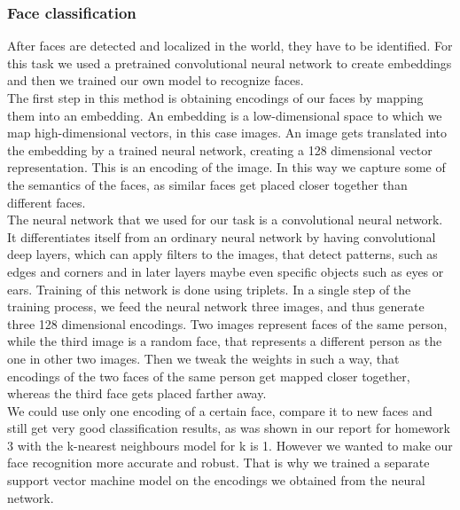 \documentclass[12pt,a4paper]{article}
\begin{document}
	\subsubsection{Face classification}
	After faces are detected and localized in the world, they have to be identified. For this task we used a pretrained convolutional neural network to create embeddings and then we trained our own model to recognize faces. \\

	The first step in this method is obtaining encodings of our faces by mapping them into an embedding. An embedding is a low-dimensional space to which we map high-dimensional vectors, in this case images. An image gets translated into the embedding by a trained neural network, creating a 128 dimensional vector representation. This is an encoding of the image. In this way we capture some of the semantics of the faces, as similar faces get placed closer together than different faces. \\

	The neural network that we used for our task is a convolutional neural network. It differentiates itself from an ordinary neural network by having convolutional deep layers, which can apply filters to the images, that detect patterns, such as edges and corners and in later layers maybe even specific objects such as eyes or ears. Training of this network is done using triplets. In a single step of the training process, we feed the neural network three images, and thus generate three 128 dimensional encodings. Two images represent faces of the same person, while the third image is a random face, that represents a different person as the one in other two images. Then we tweak the weights in such a way, that encodings of the two faces of the same person get mapped closer together, whereas the third face gets placed farther away. \\

	We could use only one encoding of a certain face, compare it to new faces and still get very good classification results, as was shown in our report for homework 3 with the k-nearest neighbours model for k is 1. However we wanted to make our face recognition more accurate and robust. That is why we trained a separate support vector machine model on the encodings we obtained from the neural network. \\

	
\end{document}
